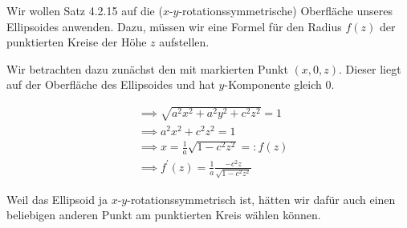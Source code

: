 \begin{solution}

\phantom{}

\begin{center}
\end{center}


Wir wollen Satz 4.2.15 auf die ($x$-$y$-rotationssymmetrische) Oberfläche unseres Ellipsoides anwenden.
Dazu, müssen wir eine Formel für den Radius $f(z)$ der punktierten Kreise der Höhe $z$ aufstellen.

Wir betrachten dazu zunächst den mit \Quote{$\times$} markierten Punkt $(x, 0, z)$.
Dieser liegt auf der Oberfläche des Ellipsoides und hat $y$-Komponente gleich $0$.

\begin{align*}
    & \implies
    \sqrt{a^2 x^2 + a^2 y^2 + c^2 z^2} = 1 \\
    & \implies
    a^2 x^2 + c^2 z^2 = 1 \\
    & \implies
    x = \frac{1}{a} \sqrt{1 - c^2 z^2} =: f(z) \\
    & \implies
    f^\prime(z) = \frac{1}{a} \frac{-c^2 z}{\sqrt{1 - c^2 z^2}}
\end{align*}

Weil das Ellipsoid ja $x$-$y$-rotationssymmetrisch ist, hätten wir dafür auch einen beliebigen anderen Punkt am punktierten Kreis wählen können.


\end{solution}
